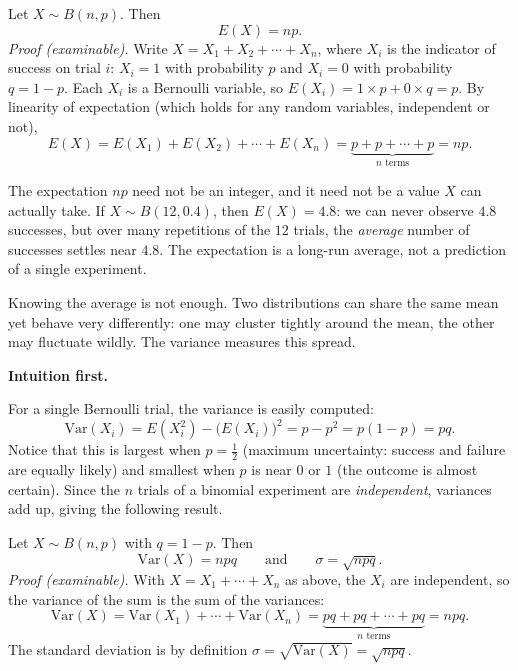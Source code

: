 \documentclass[11pt]{article}
\newcommand{\cle}[1]{{\popxbold\color{popdark}#1}}
\newcounter{popsec}
\newcounter{popsub}
\newcommand{\courssub}[1]{%
  \stepcounter{popsub}%
  \par\vspace{9pt}\noindent{\popxbold\fontsize{11.5}{13}\selectfont\color{popink}{\color{poporange}\thepopsec.\thepopsub}\hspace{6pt}#1}\par\nopagebreak\vspace{4pt}
}
\begin{document}
\begin{propriete}[Expectation of $B(n,p)$]
Let $X\sim B(n,p)$. Then
\[ E(X)=np. \]
\emph{Proof (examinable).} Write $X=X_1+X_2+\cdots+X_n$, where $X_i$ is the indicator of success on trial $i$: $X_i=1$ with probability $p$ and $X_i=0$ with probability $q=1-p$. Each $X_i$ is a Bernoulli variable, so $E(X_i)=1\times p+0\times q=p$. By linearity of expectation (which holds for any random variables, independent or not),
\[ E(X)=E(X_1)+E(X_2)+\cdots+E(X_n)=\underbrace{p+p+\cdots+p}_{n\text{ terms}}=np. \]
\end{propriete}

\begin{attention}
The expectation $np$ need not be an integer, and it need not be a value $X$ can actually take. If $X\sim B(12,0.4)$, then $E(X)=4.8$: we can never observe $4.8$ successes, but over many repetitions of the $12$ trials, the \emph{average} number of successes settles near $4.8$. The expectation is a long-run average, not a prediction of a single experiment.
\end{attention}

\courssub{Variance and Standard Deviation}

Knowing the average is not enough. Two distributions can share the same mean yet behave very differently: one may cluster tightly around the mean, the other may fluctuate wildly. The \cle{variance} measures this spread.

\textbf{Intuition first.}\par
For a single Bernoulli trial, the variance is easily computed:
\[ \mathrm{Var}(X_i)=E(X_i^2)-\big(E(X_i)\big)^2=p-p^2=p(1-p)=pq. \]
Notice that this is largest when $p=\tfrac12$ (maximum uncertainty: success and failure are equally likely) and smallest when $p$ is near $0$ or $1$ (the outcome is almost certain). Since the $n$ trials of a binomial experiment are \emph{independent}, variances add up, giving the following result.

\begin{propriete}[Variance of $B(n,p)$]
Let $X\sim B(n,p)$ with $q=1-p$. Then
\[ \mathrm{Var}(X)=npq \qquad\text{and}\qquad \sigma=\sqrt{npq}. \]
\emph{Proof (examinable).} With $X=X_1+\cdots+X_n$ as above, the $X_i$ are independent, so the variance of the sum is the sum of the variances:
\[ \mathrm{Var}(X)=\mathrm{Var}(X_1)+\cdots+\mathrm{Var}(X_n)=\underbrace{pq+pq+\cdots+pq}_{n\text{ terms}}=npq. \]
The standard deviation is by definition $\sigma=\sqrt{\mathrm{Var}(X)}=\sqrt{npq}$.
\end{propriete}
\end{document}
